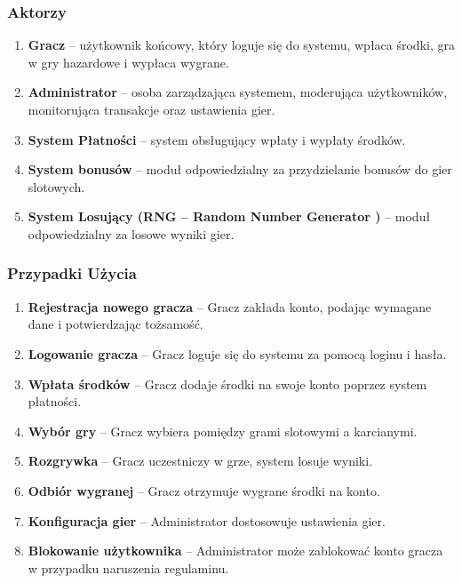 \documentclass[a4paper,12pt]{article}
\begin{document}
\subsubsection*{Aktorzy}

\begin{enumerate}
\def\labelenumi{\arabic{enumi}.}
\item
  \textbf{Gracz} -- użytkownik końcowy, który loguje się do systemu,
  wpłaca środki, gra w gry hazardowe i wypłaca wygrane.
\item
  \textbf{Administrator} -- osoba zarządzająca systemem, moderująca
  użytkowników, monitorująca transakcje oraz ustawienia gier.
\item
  \textbf{System Płatności} -- system obsługujący wpłaty i wypłaty
  środków.
\item
  \textbf{System bonusów} -- moduł odpowiedzialny za przydzielanie
  bonusów do gier slotowych.
\item
  \textbf{System Losujący (RNG -- Random Number Generator \cite{rng})} -- moduł
  odpowiedzialny za losowe wyniki gier.
\end{enumerate}

\subsubsection*{Przypadki Użycia}

\begin{enumerate}
\def\labelenumi{\arabic{enumi}.}
\item
  \textbf{Rejestracja nowego gracza} -- Gracz zakłada konto, podając
  wymagane dane i potwierdzając tożsamość.
\item
  \textbf{Logowanie gracza} -- Gracz loguje się do systemu za pomocą
  loginu i hasła.
\item
  \textbf{Wpłata środków} -- Gracz dodaje środki na swoje konto poprzez
  system płatności.
\item
  \textbf{Wybór gry} -- Gracz wybiera pomiędzy grami slotowymi a
  karcianymi.
\item
  \textbf{Rozgrywka} -- Gracz uczestniczy w grze, system losuje wyniki.
\item
  \textbf{Odbiór wygranej} -- Gracz otrzymuje wygrane środki na konto.
\item
  \textbf{Konfiguracja gier} -- Administrator dostosowuje ustawienia
  gier.
\item
  \textbf{Blokowanie użytkownika} -- Administrator może zablokować konto
  gracza w przypadku naruszenia regulaminu.
\end{enumerate}
\end{document}

